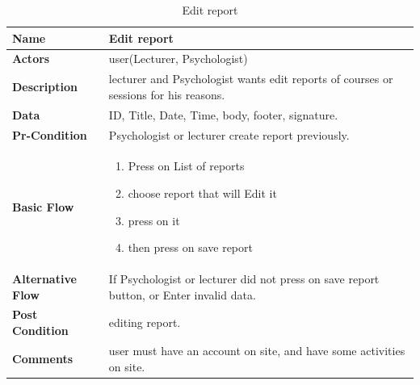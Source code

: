\documentclass[../Psychological_system_web_application.tex]{subfiles}
\begin{document}
	\begin{center}
		\begin{table}[h!]
			\begin{tabular}{ | m{4cm} | m{10cm}| } 
				\hline
			 	\textbf{\large Name}& Edit report\\ 
				\hline
			  	\textbf{\large Actors}& user(Lecturer, Psychologist)\\ 
				\hline
			  	\textbf{\large Description}& lecturer and Psychologist wants edit reports of courses or sessions for his reasons.\\ 
				\hline
				\textbf{\large Data}& ID, Title, Date, Time, body, footer, signature.\\ 
				\hline
				 \textbf{\large Pr-Condition}& Psychologist or lecturer create report previously. \\ 
				\hline
				\textbf{\large Basic Flow}&\begin{enumerate}
				\item
					Press on List of reports
				\item
					choose report that will Edit it
				\item 
					press on it
				\item
					then press on save report \end{enumerate}\\
					\hline
				\textbf{\large Alternative Flow}& If Psychologist or lecturer did not press on save report button, or Enter invalid data.\\ 
				\hline
				\textbf{\large Post Condition}& editing report.\\ 
				\hline
				\textbf{\large Comments}& user must have an account on site, and have some activities on site.\\ 
				\hline
			\end{tabular}
			\caption{Edit report}
			\label{table:EDIT-REPORT}
		\end{table}
	\end{center}
\end{document}

